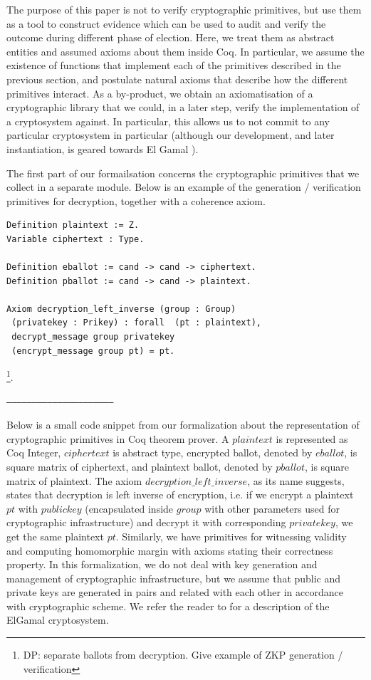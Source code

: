 \documentclass{llncs}
\begin{document}
The purpose of this paper is not to verify cryptographic primitives, 
but use them as a tool to construct evidence which can be used 
to audit and verify the outcome during different phase 
of election. Here, we treat them as abstract entities and assumed 
axioms about them inside Coq.
In particular, we assume the existence of functions that implement
each of the primitives described in the previous section, and
postulate natural axioms that describe how the different primitives
interact. As a by-product, we obtain an axiomatisation of a
cryptographic library that we could, in a later step, verify the
implementation of a cryptosystem against.  In particular, this
allows us to not commit to any particular cryptosystem in particular
(although our development, and later instantiation, is geared
towards El Gamal \cite{DBLP:conf/crypto/Gamal84}).

The first part of our formailsation concerns the cryptographic
primitives that we collect in a separate module. Below is an example
of the generation / verification primitives for decryption, together
with a coherence axiom.

\begin{lstlisting}[frame=single,basicstyle=\ttfamily\footnotesize]
Definition plaintext := Z.
Variable ciphertext : Type. 

Definition eballot := cand -> cand -> ciphertext.
Definition pballot := cand -> cand -> plaintext.

Axiom decryption_left_inverse (group : Group) 
 (privatekey : Prikey) : forall  (pt : plaintext),
 decrypt_message group privatekey 
 (encrypt_message group pt) = pt.
\end{lstlisting}
\footnote{DP: separate ballots from decryption. Give example of ZKP
generation / verification}.

{\tt --------------------------------------------------------------
}


 Below is a small code snippet from our formalization
about the representation of cryptographic primitives in Coq theorem prover.
A $plaintext$ is represented as Coq Integer, $ciphertext$ is abstract type, 
encrypted ballot, denoted by $eballot$,  is square matrix of ciphertext, and
plaintext ballot, denoted by $pballot$,  is square matrix of plaintext.
The axiom  $decryption\_left\_inverse$, as its name suggests, states 
that decryption  is left inverse of encryption, i.e.  
if we encrypt a plaintext $pt$ with $publickey$ 
(encapsulated inside $group$ with other parameters 
used for cryptographic infrastructure) and decrypt it with corresponding 
$privatekey$, we get the same plaintext $pt$. Similarly, we have 
primitives for witnessing validity and computing homomorphic margin with
axioms stating their correctness property.
In this formalization, we do not deal with key generation and management of
cryptographic infrastructure, but we assume that public and private keys 
are generated 
in pairs and related with each other in accordance with cryptographic scheme. 
We refer the reader to \cite{DBLP:conf/crypto/Gamal84} for a description
of the ElGamal cryptosystem.
   
\end{document}
